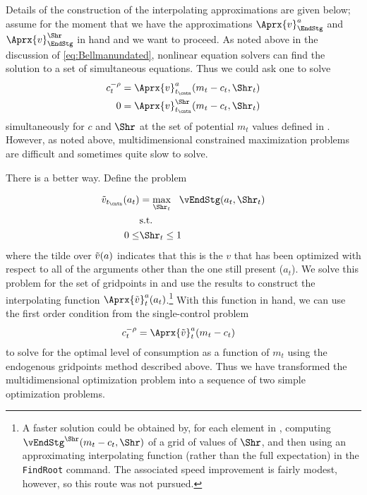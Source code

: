 \documentclass[titlepage, headings=optiontotocandhead]{Resources/texmf-local/tex/latex/econtex}
\begin{document}
Details of the construction of the interpolating approximations are given below; assume for the moment that we have the approximations $\Aprx{v}_{\EndStg}^{a}$ and $\Aprx{v}_{\EndStg}^{\Shr}$ in hand and we want to proceed.  As noted above in the discussion of \eqref{eq:Bellmanundated}, nonlinear equation solvers can find the solution to a set of simultaneous equations.  Thus we could ask one to solve
\begin{equation}\begin{gathered}\begin{aligned}
      c_{t}^{-\rho}  & = \Aprx{v}^{a}_{{t_\cntn}}(m_{t}-c_{t},\Shr_{t}) %
      \\      0  & = \Aprx{v}^{\Shr}_{{t_\cntn}}(m_{t}-c_{t},\Shr_{t}) \label{eq:FOCwrtw}
    \end{aligned}\end{gathered}\end{equation}
simultaneously for $c$ and $\Shr$ at the set of potential $m_{t}$ values defined in {\mVec}. However, as noted above, multidimensional constrained
maximization problems are difficult and sometimes quite slow to
solve.

There is a better way.  Define the problem

\begin{equation}\begin{gathered}\begin{aligned}
      \Opt{v}_{{t_\cntn}}(a_{t})  & = \max_{\Shr_{t}} ~~  \vEndStg(a_{t},\Shr_{t})
      \\      & \text{s.t.} \nonumber
      \\      0 \leq & \Shr_{t} \leq 1
    \end{aligned}\end{gathered}\end{equation}
where the tilde over $\tilde{v}(a)$ indicates that this is the $v$ that has been optimized with respect to all of the arguments other than the one still present ($a_{t}$).  We solve this problem for the set of gridpoints in  and use the results to construct the interpolating function $\Aprx{\Opt{v}}_{t}^{a}(a_{t})$.\footnote{A faster solution could be obtained by, for each element in , computing $\vEndStg^{\Shr}(m_{t}-c_{t},\Shr)$ of a grid of values of $\Shr$, and then using an approximating interpolating function (rather than the full expectation) in the \texttt{FindRoot} command.  The associated speed improvement is fairly modest, however, so this route was not pursued.}  With this function in hand, we can use the first order condition from the single-control problem
\begin{equation*}\begin{gathered}\begin{aligned}
      c_{t}^{-\rho}  & = \Aprx{\Opt{v}}_{t}^{a}(m_{t}-c_{t})
    \end{aligned}\end{gathered}\end{equation*}
to solve for the optimal level of consumption as a function of $m_{t}$ using the endogenous gridpoints method described above.  Thus we have transformed the multidimensional optimization problem into a sequence of two simple optimization problems.
\end{document}

